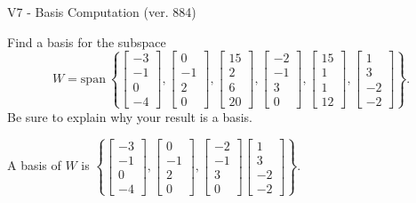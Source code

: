 \begin{exercise}
  \begin{exerciseTitle}V7 - Basis Computation (ver. 884)\end{exerciseTitle}
  \begin{exerciseStatement}
    Find a basis for the subspace 
\[W=\mathrm{span}\ \left\{\left[\begin{array}{r}
-3 \\
-1 \\
0 \\
-4
\end{array}\right] , \left[\begin{array}{r}
0 \\
-1 \\
2 \\
0
\end{array}\right] , \left[\begin{array}{r}
15 \\
2 \\
6 \\
20
\end{array}\right] , \left[\begin{array}{r}
-2 \\
-1 \\
3 \\
0
\end{array}\right] , \left[\begin{array}{r}
15 \\
1 \\
1 \\
12
\end{array}\right] , \left[\begin{array}{r}
1 \\
3 \\
-2 \\
-2
\end{array}\right]\right\}.\]
 Be sure to explain why your result is a basis.


  \end{exerciseStatement}
  \begin{exerciseAnswer}
   A basis of \(W\) is  \(\left\{\left[\begin{array}{r}
-3 \\
-1 \\
0 \\
-4
\end{array}\right] , \left[\begin{array}{r}
0 \\
-1 \\
2 \\
0
\end{array}\right] , \left[\begin{array}{r}
-2 \\
-1 \\
3 \\
0
\end{array}\right] \left[\begin{array}{r}
1 \\
3 \\
-2 \\
-2
\end{array}\right]\right\}\).
  


  \end{exerciseAnswer}
\end{exercise}